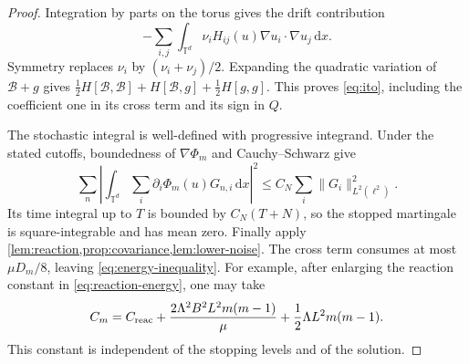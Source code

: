 \documentclass[11pt]{amsart}
\theoremstyle{definition}
\newcommand{\T}{\mathbb T}
\newcommand{\dd}{\,\mathrm d}
\newcommand{\ellTwo}{\ell^2}
\numberwithin{equation}{section}
\begin{document}
\begin{proof}
Integration by parts on the torus gives the drift contribution
\[
-\sum_{i,j}\int_{\T^d}\nu_iH_{ij}(u)
  \nabla u_i\cdot\nabla u_j\dd x.
\]
Symmetry replaces $\nu_i$ by $(\nu_i+\nu_j)/2$. Expanding the
quadratic variation of $\mathcal B+g$ gives
$\tfrac12H[\mathcal B,\mathcal B]+H[\mathcal B,g]
+\tfrac12H[g,g]$. This proves \eqref{eq:ito}, including the coefficient
one in its cross term and its sign in $Q$.

The stochastic integral is well-defined with progressive integrand.
Under the stated cutoffs, boundedness of $\nabla\Phi_m$ and
Cauchy--Schwarz give
\[
\sum_n\left|\int_{\T^d}\sum_i\partial_i\Phi_m(u)G_{n,i}\dd x\right|^2
 \leq C_N\sum_i\|G_i\|_{L^2(\ellTwo)}^2.
\]
Its time integral up to $T$ is bounded by $C_N(T+N)$, so the stopped
martingale is square-integrable and has mean zero.
Finally apply \cref{lem:reaction,prop:covariance,lem:lower-noise}.
The cross term consumes at most $\mu D_m/8$, leaving
\eqref{eq:energy-inequality}. For example, after enlarging the reaction
constant in \eqref{eq:reaction-energy}, one may take
\[
C_m=C_{\rm reac}
 +\frac{2\Lambda^2B^2L^2m(m-1)}\mu
 +\frac12\Lambda L^2m(m-1).
\]
This constant is independent of the stopping levels and of the solution.
\end{proof}
\end{document}
